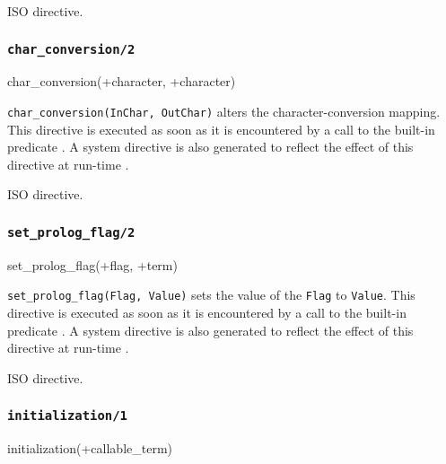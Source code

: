 \Portability

ISO directive.

\subsubsection{\texttt{char\_conversion/2}}

\begin{TemplatesOneCol}
char\_conversion(+character, +character)

\end{TemplatesOneCol}

\Description

\texttt{char\_conversion(InChar, OutChar)} alters the character-conversion
mapping. This directive is executed as soon as it is encountered by a call
to the built-in predicate 
. A system directive is also generated to reflect
the effect of this directive at run-time .

\Portability

ISO directive.

\subsubsection{\texttt{set\_prolog\_flag/2}}

\begin{TemplatesOneCol}
set\_prolog\_flag(+flag, +term)

\end{TemplatesOneCol}

\Description

\texttt{set\_prolog\_flag(Flag, Value)} sets the value of the
 \texttt{Flag} to \texttt{Value}. This directive is
executed as soon as it is encountered by a call to the built-in predicate
 . A system directive
is also generated to reflect the effect of this directive at run-time
.

\Portability

ISO directive.

\subsubsection{\texttt{initialization/1}}
\label{initialization/1}

\begin{TemplatesOneCol}
initialization(+callable\_term)

\end{TemplatesOneCol}

